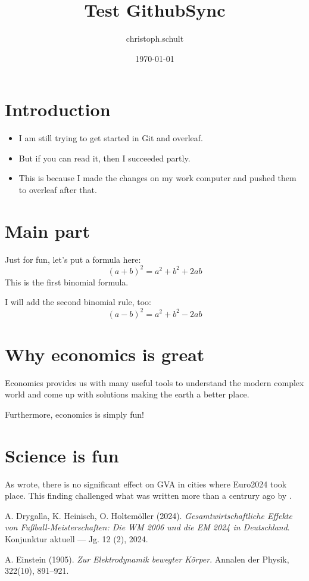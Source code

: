 \documentclass{article}
\title{Test GithubSync}
\author{christoph.schult }
\date{\today}
\begin{document}
\maketitle

\section{Introduction}

\begin{itemize} 
    \item I am still trying to get started in Git and overleaf.
    \item But if you can read it, then I succeeded partly.
    \item This is because I made the changes on my work computer and pushed them to overleaf after that.
\end{itemize}

\section{Main part}
Just for fun, let's put a formula here: 
$$ (a + b)^2 = a^2 + b^2 + 2ab $$
This is the first binomial formula. 

I will add the second binomial rule, too:
$$ (a - b)^2 = a^2 + b^2 - 2ab $$

\section{Why economics is great}
Economics provides us with many useful tools to understand the modern 
complex world and come up with solutions making the earth a better place.

Furthermore, economics is simply fun!

\section{Science is fun}
As \cite{holtem2024a} wrote, there is no significant effect on GVA in cities where Euro2024 took place. This finding challenged what was written more than a centrury ago by \cite{einstein1905}.

\begin{thebibliography}{9}

  A. Drygalla, K. Heinisch, O. Holtemöller (2024). 
  \textit{Gesamtwirtschaftliche Effekte von Fußball-Meisterschaften: Die WM 2006 und die EM 2024 in Deutschland}. 
  Konjunktur aktuell — Jg. 12 (2), 2024.


 A. Einstein (1905). 
 \textit{Zur Elektrodynamik bewegter Körper}. 
 Annalen der Physik, 322(10), 891--921.

\end{thebibliography}
\end{document}
